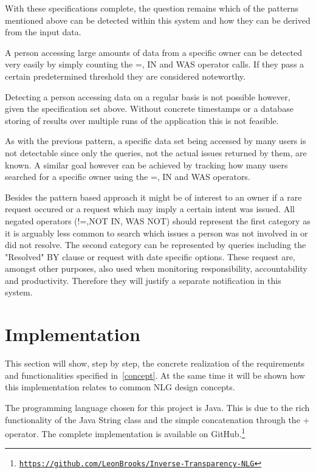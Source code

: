 \documentclass[sigconf,obeyspaces]{acmart}
\begin{document}
With these specifications complete, the question remains which of the patterns mentioned above can be detected within this system and how they can be derived from the input data.

A person accessing large amounts of data from a specific owner can be detected very easily by simply counting the =, IN and WAS operator calls. If they pass a certain predetermined threshold they are considered noteworthy.

Detecting a person accessing data on a regular basis is not possible however, given the specification set above. Without concrete timestamps or a database storing of results over multiple runs of the application this is not feasible.

As with the previous pattern, a specific data set being accessed by many users is not detectable since only the queries, not the actual issues returned by them, are known. A similar goal however can be achieved by tracking how many users searched for a specific owner using the =, IN and WAS operators.

Besides the pattern based approach it might be of interest to an owner if a rare request occured or a request which may imply a certain intent was issued. All negated operators (!=,NOT IN, WAS NOT) should represent the first category as it is arguably less common to search which issues a person was not involved in or did not resolve. The second category can be represented by queries including the "Resolved" BY clause or request with date specific options. These request are, amongst other purposes, also used when monitoring responsibility, accountability and productivity. Therefore they will justify a separate notification in this system.

\section{Implementation} \label{impl}
This section will show, step by step, the concrete realization of the requirements and functionalities specified in~\ref{concept}. At the same time it will be shown how this implementation relates to common NLG design concepts.

The programming language chosen for this project is Java. This is due to the rich functionality of the Java String class and the simple concatenation through the + operator.
The complete implementation is available on GitHub.\footnote{\texttt{\url{https://github.com/LeonBrooks/Inverse-Transparency-NLG}}}
\end{document}
